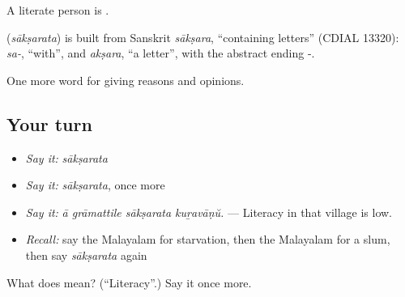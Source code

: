 A literate person is .

\begin{cousinweb}
\textbf{} (\emph{sākṣarata}) is built from Sanskrit \emph{sākṣara}, \textquotedblleft{}containing letters\textquotedblright{} (CDIAL 13320): \emph{sa-}, \textquotedblleft{}with\textquotedblright{}, and \emph{akṣara}, \textquotedblleft{}a letter\textquotedblright{}, with the abstract ending -.
\end{cousinweb}

\begin{grammarlens}[title={What you've built}]
One more word for giving reasons and opinions.
\end{grammarlens}

\subsection*{Your turn}
\begin{itemize}
\raggedright
  \item \emph{Say it:} \emph{sākṣarata}
  \item \emph{Say it:} \emph{sākṣarata}, once more
  \item \emph{Say it:} \emph{ā grāmattile sākṣarata kuṟavāṇŭ.} — Literacy in that village is low.
  \item \emph{Recall:} say the Malayalam for starvation, then the Malayalam for a slum, then say \emph{sākṣarata} again
\end{itemize}

\begin{tcolorbox}[breakable,colback=teal!4,colframe=teal!35!black,title={Before you move on}]
What does  mean? (\textquotedblleft{}Literacy\textquotedblright{}.) Say it once more.
\end{tcolorbox}
